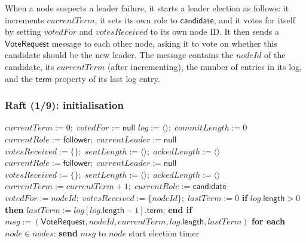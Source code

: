 When a node suspects a leader failure, it starts a leader election as follows: it increments $\mathit{currentTerm}$, it sets its own role to $\mathsf{candidate}$, and it votes for itself by setting $\mathit{votedFor}$ and $\mathit{votesReceived}$ to its own node ID.
It then sends a $\mathsf{VoteRequest}$ message to each other node, asking it to vote on whether this candidate should be the new leader.
The message contains the $\mathit{nodeId}$ of the candidate, its $\mathit{currentTerm}$ (after incrementing), the number of entries in its log, and the $\mathsf{term}$ property of its last log entry.

\begin{frame}[plain]
    \label{s:raft1}
    \frametitle{Raft (1/9): initialisation}
    \footnotesize
    \begin{algorithmic}
            \State $\mathit{currentTerm} := 0;\; \mathit{votedFor} := \mathsf{null}$
            \State $\mathit{log} := \langle\rangle;\; \mathit{commitLength} := 0$
            \State $\mathit{currentRole} := \mathsf{follower};\; \mathit{currentLeader} := \mathsf{null}$
            \State $\mathit{votesReceived} := \{\};\; \mathit{sentLength} := \langle\rangle;\; \mathit{ackedLength} := \langle\rangle$
        \EndOn
        \State
            \State $\mathit{currentRole} := \mathsf{follower};\; \mathit{currentLeader} := \mathsf{null}$
            \State $\mathit{votesReceived} := \{\};\; \mathit{sentLength} := \langle\rangle;\; \mathit{ackedLength} := \langle\rangle$
        \EndOn
        \State
            \State $\mathit{currentTerm} := \mathit{currentTerm} + 1;\; \mathit{currentRole} := \mathsf{candidate}$
            \State $\mathit{votedFor} := \mathit{nodeId};\; \mathit{votesReceived} := \{\mathit{nodeId}\};\; \mathit{lastTerm} := 0$
            \State \textbf{if} $\mathit{log}.\mathsf{length} > 0$ \textbf{then} $\mathit{lastTerm} := \mathit{log}[\mathit{log}.\mathsf{length} - 1].\mathsf{term}$; \textbf{end if}
            \State $\mathit{msg} := (\mathsf{VoteRequest}, \mathit{nodeId}, \mathit{currentTerm}, \mathit{log}.\mathsf{length}, \mathit{lastTerm})$
            \State \textbf{for each} $\mathit{node} \in \mathit{nodes}$: \textbf{send} $\mathit{msg}$ to $\mathit{node}$
            \State start election timer
        \EndOn
    \end{algorithmic}
\end{frame}
